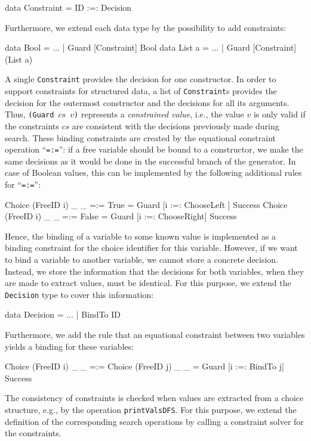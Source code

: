 \documentclass{llncs}
\newcommand{\code}[1]{\mbox{\small\texttt{#1}}}
\newcommand{\ccode}[1]{``\code{#1}''}
\begin{document}
\begin{haskell}
  data Constraint = ID :=: Decision
\end{haskell}
Furthermore, we extend each data type by the possibility to
add constraints:
\begin{haskell}
  data Bool   = $\ldots$ | Guard [Constraint] Bool
  data List a = $\ldots$ | Guard [Constraint] (List a)
\end{haskell}
A single \code{Constraint} provides the decision for
one constructor. In order to support constraints for structured data,
a list of \code{Constraint}s provides the decision for the outermost
constructor and the decisions for all its arguments.
Thus, \code{(Guard $cs$ $v$)} represents a \emph{constrained value},
i.e., the value $v$ is only valid if the constraints $cs$ are
consistent with the decisions previously made during search.
These binding constraints are created by the
equational constraint operation \ccode{=:=}: if a free variable
should be bound to a constructor, we make the same
decisions as it would be done in the successful branch
of the generator. In case of Boolean values,
this can be implemented by the following additional rules
for \ccode{=:=}:
\begin{haskell}
  Choice (FreeID i) _ _ =:= True   =  Guard [i :=: ChooseLeft ] Success
  Choice (FreeID i) _ _ =:= False  =  Guard [i :=: ChooseRight] Success
\end{haskell}
Hence, the binding of a variable to some known value
is implemented as a binding constraint for the choice identifier
for this variable. However, if we want to bind a variable
to another variable, we cannot store a concrete decision.
Instead, we store the information that the decisions for
both variables, when they are made to extract values,
must be identical. For this purpose, we extend the \code{Decision}
type to cover this information:
\begin{haskell}
  data Decision = $\ldots$ | BindTo ID
\end{haskell}
Furthermore, we add the rule that an equational constraint
between two variables yields a binding for these variables:%
\begin{haskell}
  Choice (FreeID i) _ _ =:= Choice (FreeID j) _ _
    =  Guard [i :=: BindTo j] Success
\end{haskell}
%
The consistency of constraints is checked when values are extracted
from a choice structure, e.g., by the operation \code{printValsDFS}.
For this purpose, we extend the definition of the corresponding search
operations by calling a constraint solver for the constraints.
\end{document}
